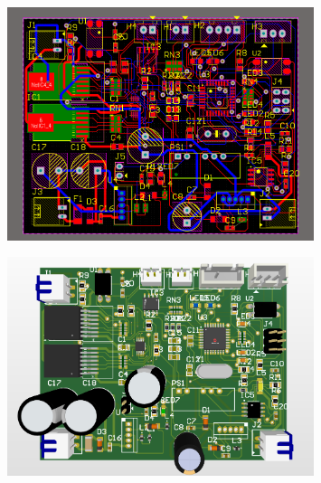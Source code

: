 \begin{figure}[H]
    \centering
    \includegraphics[width=0.8\textwidth]{pictures/7h.png}
\end{figure}
\begin{figure}[H]
    \centering
    \includegraphics[width=0.8\textwidth]{pictures/7i.png}
\end{figure}

